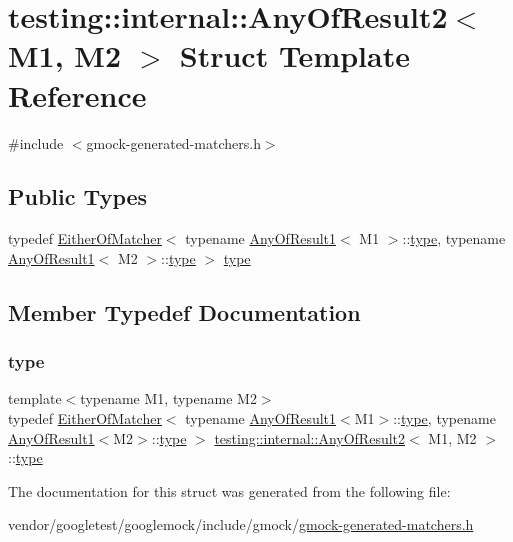 \hypertarget{structtesting_1_1internal_1_1_any_of_result2}{}\section{testing\+:\+:internal\+:\+:Any\+Of\+Result2$<$ M1, M2 $>$ Struct Template Reference}
\label{structtesting_1_1internal_1_1_any_of_result2}


{\ttfamily \#include $<$gmock-\/generated-\/matchers.\+h$>$}

\subsection*{Public Types}
\begin{DoxyCompactItemize}
\item 
typedef \hyperlink{classtesting_1_1internal_1_1_either_of_matcher}{Either\+Of\+Matcher}$<$ typename \hyperlink{structtesting_1_1internal_1_1_any_of_result1}{Any\+Of\+Result1}$<$ M1 $>$\+::\hyperlink{structtesting_1_1internal_1_1_any_of_result2_a6d9eba508021f8e652c7c154a649073f}{type}, typename \hyperlink{structtesting_1_1internal_1_1_any_of_result1}{Any\+Of\+Result1}$<$ M2 $>$\+::\hyperlink{structtesting_1_1internal_1_1_any_of_result2_a6d9eba508021f8e652c7c154a649073f}{type} $>$ \hyperlink{structtesting_1_1internal_1_1_any_of_result2_a6d9eba508021f8e652c7c154a649073f}{type}
\end{DoxyCompactItemize}


\subsection{Member Typedef Documentation}
\mbox{\label{structtesting_1_1internal_1_1_any_of_result2_a6d9eba508021f8e652c7c154a649073f}} 
\subsubsection{\texorpdfstring{type}{type}}
{\footnotesize\ttfamily template$<$typename M1, typename M2$>$ \\
typedef \hyperlink{classtesting_1_1internal_1_1_either_of_matcher}{Either\+Of\+Matcher}$<$ typename \hyperlink{structtesting_1_1internal_1_1_any_of_result1}{Any\+Of\+Result1}$<$M1$>$\+::\hyperlink{structtesting_1_1internal_1_1_any_of_result2_a6d9eba508021f8e652c7c154a649073f}{type}, typename \hyperlink{structtesting_1_1internal_1_1_any_of_result1}{Any\+Of\+Result1}$<$M2$>$\+::\hyperlink{structtesting_1_1internal_1_1_any_of_result2_a6d9eba508021f8e652c7c154a649073f}{type} $>$ \hyperlink{structtesting_1_1internal_1_1_any_of_result2}{testing\+::internal\+::\+Any\+Of\+Result2}$<$ M1, M2 $>$\+::\hyperlink{structtesting_1_1internal_1_1_any_of_result2_a6d9eba508021f8e652c7c154a649073f}{type}}



The documentation for this struct was generated from the following file\+:\begin{DoxyCompactItemize}
\item 
vendor/googletest/googlemock/include/gmock/\hyperlink{gmock-generated-matchers_8h}{gmock-\/generated-\/matchers.\+h}\end{DoxyCompactItemize}
